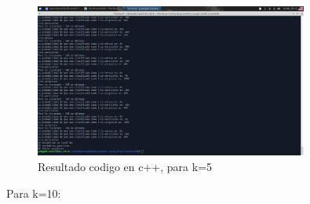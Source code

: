 \documentclass[12pt,letterpaper]{article}
\begin{document}
\begin{figure}[H]
    \centering
    \includegraphics[width=0.8\textwidth]{knnc++5.jpg}
    \caption{Resultado codigo en c++, para k=5}
    \label{fig:5}
\end{figure}

Para k=10:
\end{document}
